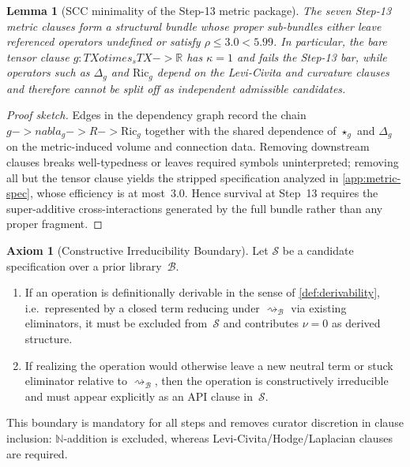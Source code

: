 \documentclass[11pt,a4paper]{article}
\def\to{->}%
\def\otimes{otimes}%
\def\nabla{nabla}%
\theoremstyle{plain}
\newtheorem{lemma}[theorem]{Lemma}
\theoremstyle{definition}
\newtheorem{axiom}[theorem]{Axiom}
\theoremstyle{remark}
\newcommand{\N}{\mathbb{N}}
\begin{document}
\begin{lemma}[SCC minimality of the Step-13 metric package]
\label{lem:metric-scc}
The seven Step-13 metric clauses form a structural bundle whose proper sub-bundles either leave referenced operators undefined or satisfy $\rho \le 3.0 < 5.99$.
In particular, the bare tensor clause $g : TX \otimes_s TX \to \mathbb{R}$ has $\kappa=1$ and fails the Step-13 bar, while operators such as $\Delta_g$ and $\mathrm{Ric}_g$ depend on the Levi-Civita and curvature clauses and therefore cannot be split off as independent admissible candidates.
\end{lemma}

\begin{proof}[Proof sketch]
Edges in the dependency graph record the chain $g \to \nabla_g \to R \to \mathrm{Ric}_g$ together with the shared dependence of $\star_g$ and $\Delta_g$ on the metric-induced volume and connection data.
Removing downstream clauses breaks well-typedness or leaves required symbols uninterpreted; removing all but the tensor clause yields the stripped specification analyzed in \cref{app:metric-spec}, whose efficiency is at most~$3.0$.
Hence survival at Step~13 requires the super-additive cross-interactions generated by the full bundle rather than any proper fragment.
\end{proof}

\begin{axiom}[Constructive Irreducibility Boundary]
\label{ax:constructive-irreducibility}
Let $\mathcal{S}$ be a candidate specification over a prior library~$\mathcal{B}$.
\begin{enumerate}[nosep]
    \item If an operation is definitionally derivable in the sense of \cref{def:derivability}, i.e.\ represented by a closed term reducing under $\rightsquigarrow_{\mathcal{B}}$ via existing eliminators, it must be excluded from~$\mathcal{S}$ and contributes $\nu=0$ as derived structure.
    \item If realizing the operation would otherwise leave a new neutral term or stuck eliminator relative to $\rightsquigarrow_{\mathcal{B}}$, then the operation is constructively irreducible and must appear explicitly as an API clause in~$\mathcal{S}$.
\end{enumerate}
This boundary is mandatory for all steps and removes curator discretion in clause inclusion: $\N$-addition is excluded, whereas Levi-Civita/Hodge/Laplacian clauses are required.
\end{axiom}
\end{document}
